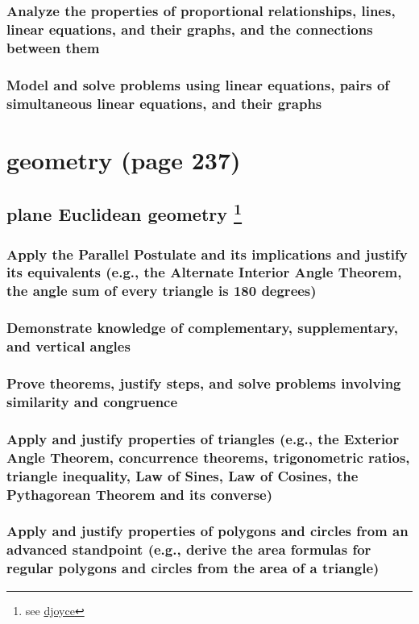 \documentclass[11pt]{article}
\begin{document}
\subsubsection{Analyze the properties of proportional relationships, lines, linear equations, and their graphs, and the connections between them}
\label{sec:orgf4f59b1}
\subsubsection{Model and solve problems using linear equations, pairs of simultaneous linear equations, and their graphs}
\label{sec:org028c4d5}
\section{geometry (page 237)}
\label{sec:org0745125}
\subsection[plane Euclidean geometry ]{plane Euclidean geometry \footnote{see \href{http://aleph0.clarku.edu/\~djoyce/java/elements/}{djoyce}}}
\label{sec:orgdc4ba2b}
\subsubsection{Apply the Parallel Postulate and its implications and justify its equivalents (e.g., the Alternate Interior Angle Theorem, the angle sum of every triangle is 180 degrees)}
\label{sec:org0af4baf}
\subsubsection{Demonstrate knowledge of complementary, supplementary, and vertical angles}
\label{sec:orgd483731}
\subsubsection{Prove theorems, justify steps, and solve problems involving similarity and congruence}
\label{sec:org2eb0761}
\subsubsection{Apply and justify properties of triangles (e.g., the Exterior Angle Theorem, concurrence theorems, trigonometric ratios, triangle inequality, Law of Sines, Law of Cosines, the Pythagorean Theorem and its converse)}
\label{sec:org36b86e3}
\subsubsection{Apply and justify properties of polygons and circles from an advanced standpoint (e.g., derive the area formulas for regular polygons and circles from the area of a triangle)}
\label{sec:orgc77ac01}
\end{document}
